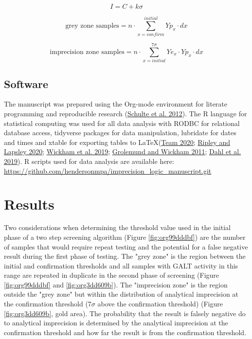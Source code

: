 \documentclass[review]{elsarticle}
\begin{document}
\begin{equation}\label{eq:initial}
I = C + k\sigma 
\end{equation}

\begin{equation}\label{eq:grey}
\text{grey zone samples}  =  n \cdot \sum_{x=confirm}^{initial} Yp_x \cdot dx
\end{equation}

\begin{equation}\label{eq:imprecision}
\text{imprecision zone samples}  =  n \cdot \sum_{x=initial}^{7\sigma} Ye_x \cdot Yp_x \cdot dx
\end{equation}

\subsection*{Software}
\label{sec:org2d09952}
The manuscript was prepared using the Org-mode environment for
literate programming and reproducible research (\hyperlink{citeproc_bib_item_8}{Schulte et al. 2012}). The R language for statistical computing was used
for all data analysis with RODBC for relational database access,
tidyverse packages for data manipulation, lubridate for dates and
times and xtable for exporting tables to
\LaTeX (\hyperlink{citeproc_bib_item_10}{Team 2020}; \hyperlink{citeproc_bib_item_7}{Ripley and Lapsley 2020}; \hyperlink{citeproc_bib_item_12}{Wickham et al. 2019}; \hyperlink{citeproc_bib_item_5}{Grolemund and Wickham 2011}; \hyperlink{citeproc_bib_item_3}{Dahl et al. 2019}). R scripts
used for data analysis are available here:
\url{https://github.com/hendersonmpa/imprecision\_logic\_manuscript.git}

\section*{Results}
\label{sec:org6d60e95}

Two considerations when determining the threshold value used in the
initial phase of a two step screening algorithm (Figure \ref{fig:org99dddbf})
are the number of samples that would require repeat testing and the
potential for a false negative result during the first phase of
testing.  The "grey zone" is the region between the initial and
confirmation thresholds and all samples with GALT activity in this
range are repeated in duplicate in the second phase of screening
(Figure \ref{fig:org99dddbf} and \ref{fig:org3dd609b}). The "imprecision zone" is
the region outside the "grey zone" but within the distribution of
analytical imprecision at the confirmation threshold (7\(\sigma\) above
the confirmation threshold) (Figure \ref{fig:org3dd609b}, gold area). The
probability that the result is falsely negative do to analytical
imprecision is determined by the analytical imprecision at the
confirmation threshold and how far the result is from the confirmation
threshold.
\end{document}
